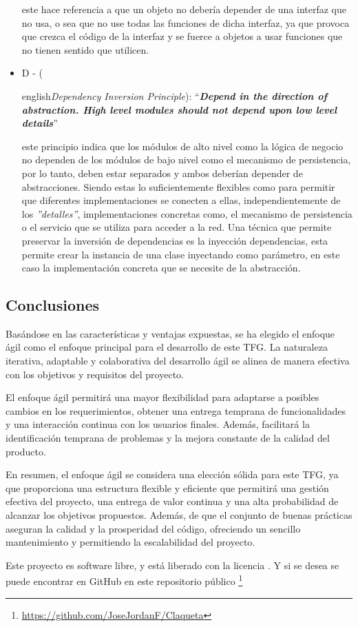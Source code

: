 \begin{itemize}
    este hace referencia a que un objeto no debería depender de una interfaz que no usa, o sea que no use todas las
    funciones de dicha interfaz, ya que provoca que crezca el código de la interfaz y se fuerce a objetos a usar 
    funciones que no tienen sentido que utilicen.
    \item D - (\begin{otherlanguage} {english}\textit{Dependency Inversion Principle}):
    ``\textit{\textbf{Depend in the direction of abstraction. High level modules should not depend upon low level details}}''\end{otherlanguage}
    este principio indica que los módulos de alto nivel como la lógica de negocio no dependen de los 
    módulos de bajo nivel como el mecanismo de persistencia, por lo tanto, deben estar separados y ambos deberían 
    depender de abstracciones. Siendo estas lo suficientemente flexibles como para permitir que diferentes
    implementaciones se conecten a ellas, independientemente de los \textit{''detalles''}, implementaciones concretas 
    como, el mecanismo de persistencia o el servicio que se utiliza para acceder a la red. Una técnica que permite
    preservar la inversión de dependencias es la inyección dependencias, esta permite crear la instancia de una clase 
    inyectando como parámetro, en este caso la implementación concreta que se necesite de la abstracción.
\end{itemize}

\subsection{Conclusiones}

Basándose en las características y ventajas expuestas, se ha elegido el enfoque ágil como el enfoque 
principal para el desarrollo de este TFG. La naturaleza iterativa, adaptable y colaborativa del 
desarrollo ágil se alinea de manera efectiva con los objetivos y requisitos del proyecto.

El enfoque ágil permitirá una mayor flexibilidad para adaptarse a posibles cambios en los 
requerimientos, obtener una entrega temprana de funcionalidades y una interacción continua con los usuarios 
finales. Además, facilitará la identificación temprana de problemas y la mejora constante de la calidad 
del producto.

En resumen, el enfoque ágil se considera una elección sólida para este TFG, ya que proporciona una 
estructura flexible y eficiente que permitirá una gestión efectiva del proyecto, una entrega de valor 
continua y una alta probabilidad de alcanzar los objetivos propuestos. Además, de que el conjunto de buenas prácticas 
aseguran la calidad y la prosperidad del código, ofreciendo un sencillo mantenimiento y permitiendo la escalabilidad 
del proyecto.

Este proyecto es software libre, y está liberado con la licencia \cite{gplv3}. Y si se desea se puede encontrar en 
GitHub en este repositorio público \footnote{\url{https://github.com/JoseJordanF/Claqueta}}